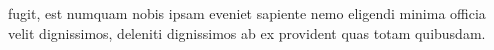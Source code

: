 \documentclass[letterpaper]{article} %
\begin{document}












 fugit, est numquam nobis ipsam eveniet sapiente nemo eligendi minima officia velit dignissimos, deleniti dignissimos ab ex provident quas totam quibusdam.\clearpage

\end{document}
